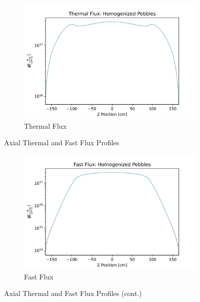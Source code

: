 \begin{figure}[H]
\centering

\begin{subfigure}{0.9\textwidth}
  \includegraphics[width=0.95\linewidth]{figures/therm_flux_homog_z.png}
  \caption{Thermal Flux}
  \label{fig:hom-det-z-therm}
\end{subfigure}%

\caption{Axial Thermal and Fast Flux Profiles}
\end{figure}

\begin{figure}[H]\ContinuedFloat
\centering

\begin{subfigure}{0.9\textwidth}
  \includegraphics[width=0.95\linewidth]{figures/fast_flux_homog_z.png}
  \caption{Fast Flux}
  \label{fig:hom-det-z-fast}
\end{subfigure}

%
\caption{Axial Thermal and Fast Flux Profiles (cont.)}
\label{fig:hom-det-z}
\end{figure}